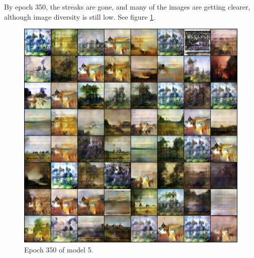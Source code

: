 \documentclass[11pt,letterpaper]{article}
\begin{document}
				By epoch 350, the streaks are gone, and many of the images are getting clearer, although image diversity is still low.
				See figure \ref{fig:wa128:epoch350generator}.
				\begin{figure}
					\centering
					\includegraphics[width=1.0\linewidth]{results/model5/epoch350_generator}
					\caption{Epoch 350 of model 5.}
					\label{fig:wa128:epoch350generator}
				\end{figure}
\end{document}
